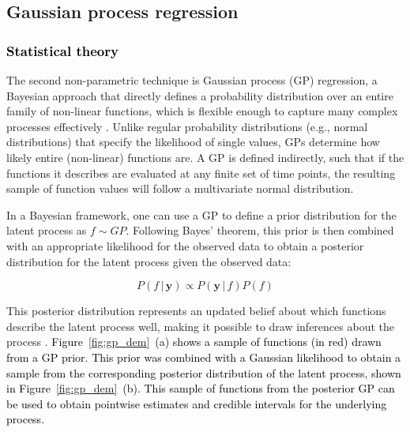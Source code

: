 \documentclass[man, floatsintext]{apa7}
\begin{document}
\subsection{Gaussian process regression}

\subsubsection{\textcolor{black}{Statistical theory}}

The second non-parametric technique is Gaussian process (GP) regression, a
Bayesian approach that directly defines a probability distribution over an
entire family of non-linear functions, which is flexible enough to capture many
complex processes effectively \parencite{rasmussen_gaussian_2006,
  betancourt_robust_2020, roberts_gaussian_2013}. Unlike regular probability
distributions (e.g., normal distributions) that specify the likelihood of
single values, GPs determine how likely entire (non-linear) functions are. A GP
is defined indirectly, such that if the functions it describes are evaluated at
any finite set of time points, the resulting sample of function values will
follow a multivariate normal distribution.

In a Bayesian framework, one can use
a GP to define a prior distribution for the latent process as $f \sim GP$.
Following Bayes' theorem, this prior is then combined with an appropriate
likelihood for the observed data to obtain a posterior distribution for the
latent process given the observed data:

\begin{equation}
  P(f \, | \, \textbf{y})  \propto P(\textbf{y} \, | \, f) P(f)
\end{equation}

\noindent This posterior distribution represents an updated belief about which
functions describe the latent process well, making it possible to draw
inferences about the process \parencite{rasmussen_gaussian_2006}.
\textcolor{black}{
  Figure~\ref{fig:gp_dem}~(a) shows a sample of functions (in red) drawn from a
  GP prior. This prior was combined with a Gaussian likelihood to obtain a
  sample
  from the corresponding posterior distribution of the latent process, shown in
  Figure~\ref{fig:gp_dem}~(b). This sample of functions from the posterior GP
  can
  be used to obtain pointwise estimates and credible intervals for the
  underlying
  process.
}
\end{document}
